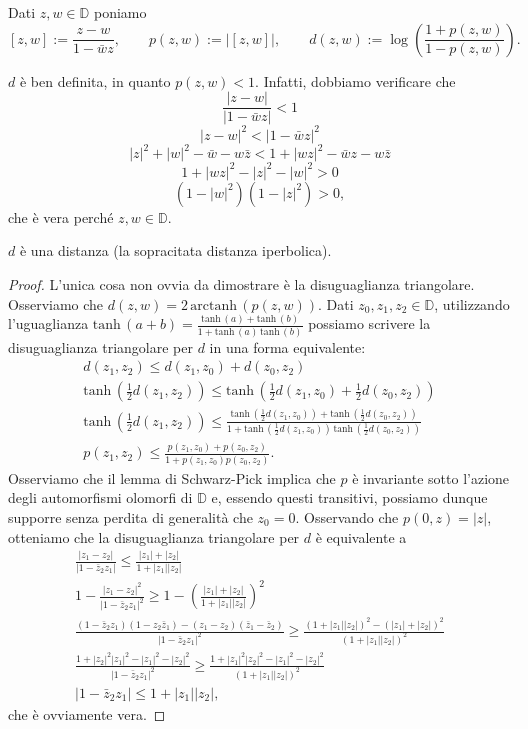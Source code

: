 \begin{defn}
  Dati $z, w \in \mathbb{D}$ poniamo
  $$[z,w]:=\frac{z-w}{1-\bar{w}z}, \qquad p(z,w):=|[z,w]|, \qquad d(z,w):=\log\left(\frac{1+p(z,w)}{1-p(z,w)}\right).$$
\end{defn}

$d$ è ben definita, in quanto $p(z,w)<1$. Infatti, dobbiamo verificare che
  $$\frac{|z-w|}{|1-\bar{w}z|} < 1$$
  $$|z-w|^2 < |1-\bar{w}z|^2$$
  $$|z|^2+|w|^2-\bar{w}-w\bar{z} < 1+|wz|^2-\bar{w}z-w\bar{z}$$
  $$1+|wz|^2-|z|^2-|w|^2 > 0$$
  $$(1-|w|^2)(1-|z|^2) > 0,$$
che è vera perché $z, w \in \mathbb{D}$.

\begin{prop}
  $d$ è una distanza (la sopracitata distanza iperbolica).
\end{prop}

\begin{proof}
  L'unica cosa non ovvia da dimostrare è la disuguaglianza triangolare. Osserviamo che $d(z,w)=2\,\text{arctanh}\,(p(z,w))$. Dati $z_0, z_1, z_2 \in \mathbb{D}$, utilizzando l'uguaglianza $\text{tanh}\,(a+b)=\frac{\text{tanh}\,(a)+\text{tanh}\,(b)}{1+\text{tanh}\,(a)\,\text{tanh}\,(b)}$ possiamo scrivere la disuguaglianza triangolare per $d$ in una forma equivalente:
  \begin{align*}
    d(z_1, z_2) \le d(z_1, z_0)+d(z_0,z_2) \\
    \text{tanh}\,\left(\frac{1}{2}d(z_1,z_2)\right) \le \text{tanh}\,\left(\frac{1}{2}d(z_1, z_0)+\frac{1}{2}d(z_0,z_2)\right) \\
    \text{tanh}\,\left(\frac{1}{2}d(z_1,z_2)\right) \le \frac{\text{tanh}\,(\frac{1}{2}d(z_1, z_0))+\text{tanh}\,(\frac{1}{2}d(z_0,z_2))}{1+\text{tanh}\,(\frac{1}{2}d(z_1, z_0))\,\text{tanh}\,(\frac{1}{2}d(z_0,z_2))} \\
    p(z_1,z_2) \le \frac{p(z_1,z_0)+p(z_0,z_2)}{1+p(z_1,z_0)p(z_0,z_2)}.
  \end{align*}
  Osserviamo che il lemma di Schwarz-Pick implica che $p$ è invariante sotto l'azione degli automorfismi olomorfi di $\mathbb{D}$ e, essendo questi transitivi, possiamo dunque supporre senza perdita di generalità che $z_0=0$. Osservando che $p(0,z)=|z|$, otteniamo che la disuguaglianza triangolare per $d$ è equivalente a
  \begin{gather*}
    \frac{|z_1-z_2|}{|1-\bar{z}_2z_1|} \le \frac{|z_1|+|z_2|}{1+|z_1||z_2|} \\
    1-\frac{|z_1-z_2|^2}{|1-\bar{z}_2z_1|^2} \ge 1-\left(\frac{|z_1|+|z_2|}{1+|z_1||z_2|}\right)^2 \\
    \frac{(1-\bar{z}_2z_1)(1-z_2\bar{z}_1)-(z_1-z_2)(\bar{z}_1-\bar{z}_2)}{|1-\bar{z}_2z_1|^2} \ge \frac{(1+|z_1||z_2|)^2-(|z_1|+|z_2|)^2}{(1+|z_1||z_2|)^2} \\
    \frac{1+|z_2|^2|z_1|^2-|z_1|^2-|z_2|^2}{|1-\bar{z}_2z_1|^2} \ge \frac{1+|z_1|^2|z_2|^2-|z_1|^2-|z_2|^2}{(1+|z_1||z_2|)^2} \\
    |1-\bar{z}_2z_1| \le 1+|z_1||z_2|,
  \end{gather*}
  che è ovviamente vera.
\end{proof}

